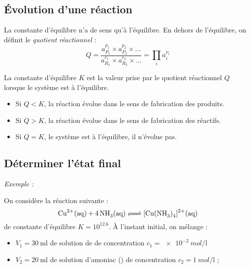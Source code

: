 \documentclass[MPSI]{cours}
\begin{document}
\subsection{Évolution d'une réaction}%
\label{sub:evolution_d_une_reaction}
La constante d'équilibre n'a de sens qu'à l'équilibre. En dehors de l'équilibre, on définit le \emph{quotient réactionnel} : 
\begin{equation*}
  Q = \frac{a_{P_1}^{p_1}\times a_{P_2}^{p_2}\times\ldots}{a_{R_1}^{r_1}\times a_{R_2}^{r_2}\times \ldots} = \prod_i a_i^{\nu_i}
\end{equation*}

La constante d'équilibre $K$ est la valeur prise par le quotient réactionnel $Q$ lorsque le système est à l'équilibre.
\begin{itemize}
  \item Si $Q<K$, la réaction évolue dans le sens de fabrication des produits.
  \item Si $Q>K$, la réaction évolue dans le sens de fabrication des réactifs.
  \item Si $Q=K$, le système est à l'équilibre, il n'évolue pas.
\end{itemize}

\subsection{Déterminer l'état final}%
\label{sub:determiner_l_etat_final}

\noindent\textit{Exemple : }

On considère la réaction suivante :
\begin{equation*}
  \ce{Cu^{2+}(aq) + 4NH3(aq) <=> [Cu(NH3)4]^{2+}(aq)}
\end{equation*}
de constante d'équilibre $K = 10^{\num{12.6}}$. À l'instant initial, on mélange :
\begin{itemize}
  \item $V_1 = \SI{30}{\milli\litre}$ de solution de  de concentration $c_1 = \SI{e-2}{mol/\litre}$ 
  \item $V_2 = \SI{20}{\milli\litre}$ de solution d'amoniac () de concentration $c_2 = \SI{1}{mol/\litre}$ ;
\end{itemize}
\end{document}
